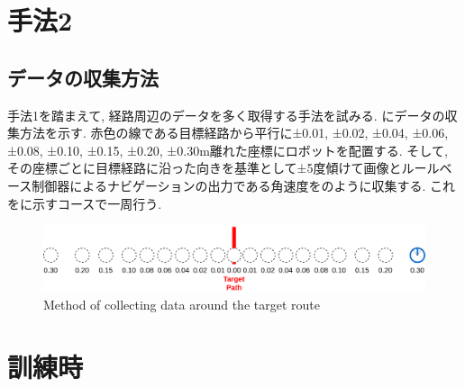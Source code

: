 \newpage
\section{手法2}

\subsection{データの収集方法}
手法1を踏まえて, 経路周辺のデータを多く取得する手法を試みる. にデータの収集方法を示す. 赤色の線である目標経路から平行に±0.01, ±0.02, ±0.04, ±0.06, ±0.08, ±0.10, ±0.15, ±0.20, ±0.30m離れた座標にロボットを配置する. そして, その座標ごとに目標経路に沿った向きを基準として±5度傾けて画像とルールベース制御器によるナビゲーションの出力である角速度をのように収集する. これをに示すコースで一周行う. 

\vspace{10mm}

\begin{figure}[h]
  \centering
  \includegraphics[keepaspectratio, scale=0.18]{images/collect-data.png}
  \caption{Method of collecting data around the target route}
  \label{Fig:collect-data}
  \end{figure}

\newpage
\section{訓練時}